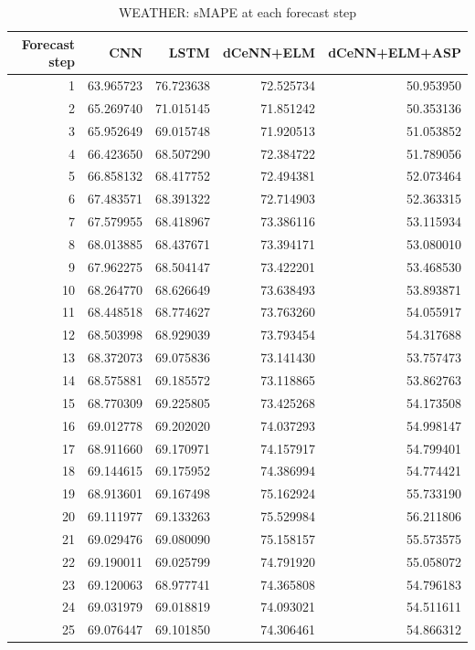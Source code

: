\begin{table}
\caption{WEATHER: sMAPE at each forecast step}
\begin{tabular}{rrrrr}
\toprule
Forecast step & CNN & LSTM & dCeNN+ELM & dCeNN+ELM+ASP \\
\midrule
1 & 63.965723 & 76.723638 & 72.525734 & 50.953950 \\
2 & 65.269740 & 71.015145 & 71.851242 & 50.353136 \\
3 & 65.952649 & 69.015748 & 71.920513 & 51.053852 \\
4 & 66.423650 & 68.507290 & 72.384722 & 51.789056 \\
5 & 66.858132 & 68.417752 & 72.494381 & 52.073464 \\
6 & 67.483571 & 68.391322 & 72.714903 & 52.363315 \\
7 & 67.579955 & 68.418967 & 73.386116 & 53.115934 \\
8 & 68.013885 & 68.437671 & 73.394171 & 53.080010 \\
9 & 67.962275 & 68.504147 & 73.422201 & 53.468530 \\
10 & 68.264770 & 68.626649 & 73.638493 & 53.893871 \\
11 & 68.448518 & 68.774627 & 73.763260 & 54.055917 \\
12 & 68.503998 & 68.929039 & 73.793454 & 54.317688 \\
13 & 68.372073 & 69.075836 & 73.141430 & 53.757473 \\
14 & 68.575881 & 69.185572 & 73.118865 & 53.862763 \\
15 & 68.770309 & 69.225805 & 73.425268 & 54.173508 \\
16 & 69.012778 & 69.202020 & 74.037293 & 54.998147 \\
17 & 68.911660 & 69.170971 & 74.157917 & 54.799401 \\
18 & 69.144615 & 69.175952 & 74.386994 & 54.774421 \\
19 & 68.913601 & 69.167498 & 75.162924 & 55.733190 \\
20 & 69.111977 & 69.133263 & 75.529984 & 56.211806 \\
21 & 69.029476 & 69.080090 & 75.158157 & 55.573575 \\
22 & 69.190011 & 69.025799 & 74.791920 & 55.058072 \\
23 & 69.120063 & 68.977741 & 74.365808 & 54.796183 \\
24 & 69.031979 & 69.018819 & 74.093021 & 54.511611 \\
25 & 69.076447 & 69.101850 & 74.306461 & 54.866312 \\

\end{tabular}
\end{table}

